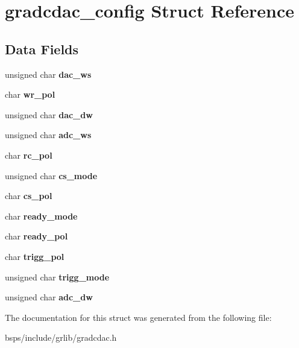 \hypertarget{structgradcdac__config}{}\section{gradcdac\+\_\+config Struct Reference}
\label{structgradcdac__config}
\subsection*{Data Fields}
\begin{DoxyCompactItemize}
\item 
\mbox{\label{structgradcdac__config_accdbc1056f0f5a3e521b7e0ce1d31571}} 
unsigned char {\bfseries dac\+\_\+ws}
\item 
\mbox{\label{structgradcdac__config_a0f5633755db948aae6e27cfb4b3f250c}} 
char {\bfseries wr\+\_\+pol}
\item 
\mbox{\label{structgradcdac__config_a5de9c44e649dd3e76c56cf6b4b3db32f}} 
unsigned char {\bfseries dac\+\_\+dw}
\item 
\mbox{\label{structgradcdac__config_a1d678f8b882441d2225121aa8a17772e}} 
unsigned char {\bfseries adc\+\_\+ws}
\item 
\mbox{\label{structgradcdac__config_a0c7b972fc30daa47fd1738a23aaa04ce}} 
char {\bfseries rc\+\_\+pol}
\item 
\mbox{\label{structgradcdac__config_a071738c22fe17c0dacee8e7511237768}} 
unsigned char {\bfseries cs\+\_\+mode}
\item 
\mbox{\label{structgradcdac__config_a3bc920365160928b2f63d2d8dc2b8e31}} 
char {\bfseries cs\+\_\+pol}
\item 
\mbox{\label{structgradcdac__config_a2f86ac97d1fda8895ca34268e6bc96f9}} 
char {\bfseries ready\+\_\+mode}
\item 
\mbox{\label{structgradcdac__config_ac1ed9829be171ae23ae80559fedb8e78}} 
char {\bfseries ready\+\_\+pol}
\item 
\mbox{\label{structgradcdac__config_a544aa8a46e6a3ece8782a257df4ca167}} 
char {\bfseries trigg\+\_\+pol}
\item 
\mbox{\label{structgradcdac__config_a9295f00994a6ad1e5d4a3b2160721985}} 
unsigned char {\bfseries trigg\+\_\+mode}
\item 
\mbox{\label{structgradcdac__config_a1c629f4687416a10ca7fdd528e67bccb}} 
unsigned char {\bfseries adc\+\_\+dw}
\end{DoxyCompactItemize}


The documentation for this struct was generated from the following file\+:\begin{DoxyCompactItemize}
\item 
bsps/include/grlib/gradcdac.\+h\end{DoxyCompactItemize}
